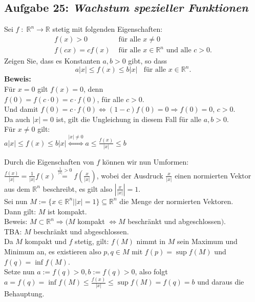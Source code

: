 \subsection*{Aufgabe 25: \mdseries\itshape Wachstum spezieller Funktionen}
Sei $f \; : \; \mathbb{R}^n \rightarrow \mathbb{R}$ stetig mit folgenden Eigenschaften:
    $$\begin{array}{rl}
        f(x) > 0 & \text{ für alle } x\not= 0\\
        f(cx) = c f(x) & \text{ für alle } x\in \mathbb{R}^n \text{ und alle }c > 0.
    \end{array}$$
    Zeigen Sie, dass es Konstanten $a,b > 0$ gibt, so dass
    $$
        a|x| \leq f(x) \leq b|x| \; \; \text{ für alle } x \in \mathbb{R}^n.
    $$
\textbf{Beweis:}\\
    Für $x = 0$ gilt $f(x) = 0$, denn \\
    $f(0) = f(c \cdot 0) = c \cdot f(0)$, für alle $c > 0$. \\
    Und damit $f(0) = c \cdot f(0) \Leftrightarrow (1 - c) f(0) = 0 \Rightarrow f(0) = 0$, $c > 0$. \\

    Da auch $|x| = 0$ ist, gilt die Ungleichung in diesem Fall für alle $a, b > 0$. \\


    Für $x \neq 0$ gilt: \\
    $a |x| \leq f(x) \leq b|x| \stackrel{|x| \neq 0}{\Leftrightarrow} a \leq \frac{f(x)}{|x|} \leq b$

    Durch die Eigenschaften von $f$ können wir nun Umformen: \\
    $\frac{f(x)}{|x|} = \frac{1}{|x|} f(x) \stackrel{\frac{1}{|x|} > 0}{=}
    f(\frac{x}{|x|})$, wobei der Ausdruck $\frac{x}{|x|}$ einen normierten Vektor
    aus dem $\mathbb{R}^n$ beschreibt, es gilt also $| \frac{x}{|x|} | = 1$. \\
    
    Sei nun $M := \{x \in \mathbb{R}^n | |x| = 1 \} \subseteq \mathbb{R}^n$ 
    die Menge der normierten Vektoren.\\
    Dann gilt: $M$ ist kompakt. \\
    Beweis: $M \subset \mathbb{R}^n \Rightarrow (M$ kompakt 
    $\Leftrightarrow M$ beschränkt und abgeschlossen$)$. \\
    TBA: $M$ beschränkt und abgeschlossen. \\

    Da $M$ kompakt und $f$ stetig, gilt: $f(M)$ nimmt in $M$ sein Maximum und Minimum an, es existieren also $p,q \in M$ mit $f(p) = \sup f(M)$ und $f(q) = \inf f(M)$. \\
    Setze nun $a := f(q) > 0, b := f(q) > 0$, also folgt \\
    $ a = f(q) = \inf f(M) \leq \frac{f(x)}{|x|} \leq \sup f(M) = f(q) = b $ und daraus die Behauptung.

